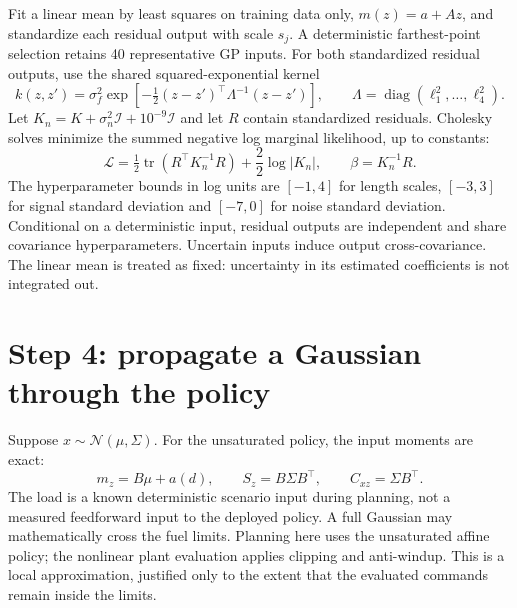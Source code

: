 \documentclass[11pt,a4paper]{article}
\begin{document}
Fit a linear mean by least squares on training data only, $m(z)=a+Az$, and standardize each residual output with scale $s_j$. A deterministic farthest-point selection retains 40 representative GP inputs. For both standardized residual outputs, use the shared squared-exponential kernel
\begin{equation}
 k(z,z')=\sigma_f^2\exp\left[-\tfrac12(z-z')^\top\Lambda^{-1}(z-z')\right],\qquad
 \Lambda=\operatorname{diag}(\ell_1^2,\ldots,\ell_4^2).
\end{equation}
Let $K_n=K+\sigma_n^2\mathcal I+10^{-9}\mathcal I$ and let $R$ contain standardized residuals. Cholesky solves minimize the summed negative log marginal likelihood, up to constants:
\begin{equation}
 \mathcal L=\tfrac12\operatorname{tr}(R^\top K_n^{-1}R)+\frac{2}{2}\log|K_n|,\qquad \beta=K_n^{-1}R.
\end{equation}
The hyperparameter bounds in log units are $[-1,4]$ for length scales, $[-3,3]$ for signal standard deviation and $[-7,0]$ for noise standard deviation. Conditional on a deterministic input, residual outputs are independent and share covariance hyperparameters. Uncertain inputs induce output cross-covariance. The linear mean is treated as fixed: uncertainty in its estimated coefficients is not integrated out.

\section{Step 4: propagate a Gaussian through the policy}
Suppose $x\sim\mathcal N(\mu,\Sigma)$. For the unsaturated policy, the input moments are exact:
\begin{equation}
 m_z=B\mu+a(d),\qquad S_z=B\Sigma B^\top,\qquad C_{xz}=\Sigma B^\top.
\end{equation}
The load is a known deterministic scenario input during planning, not a measured feedforward input to the deployed policy. A full Gaussian may mathematically cross the fuel limits. Planning here uses the unsaturated affine policy; the nonlinear plant evaluation applies clipping and anti-windup. This is a local approximation, justified only to the extent that the evaluated commands remain inside the limits.
\end{document}
